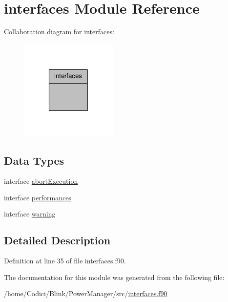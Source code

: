 \hypertarget{classinterfaces}{\section{interfaces Module Reference}
\label{classinterfaces}
}


Collaboration diagram for interfaces\-:\nopagebreak
\begin{figure}[H]
\begin{center}
\leavevmode
\includegraphics[width=138pt]{classinterfaces__coll__graph}
\end{center}
\end{figure}
\subsection*{Data Types}
\begin{DoxyCompactItemize}
\item 
interface \hyperlink{interfaceinterfaces_1_1abort_execution}{abort\-Execution}
\item 
interface \hyperlink{interfaceinterfaces_1_1performances}{performances}
\item 
interface \hyperlink{interfaceinterfaces_1_1warning}{warning}
\end{DoxyCompactItemize}


\subsection{Detailed Description}


Definition at line 35 of file interfaces.\-f90.



The documentation for this module was generated from the following file\-:\begin{DoxyCompactItemize}
\item 
/home/\-Codici/\-Blink/\-Power\-Manager/src/\hyperlink{interfaces_8f90}{interfaces.\-f90}\end{DoxyCompactItemize}
